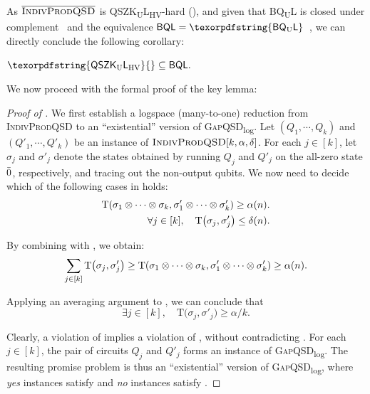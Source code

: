 \documentclass[11pt, a4paper]{article}
\numberwithin{equation}{section}
\numberwithin{figure}{section}
\newcommand{\QSZKULHV}{\texorpdfstring{\textnormal{\textsf{QSZK}\textsubscript{\textnormal{U}}\textsf{L}}\textsubscript{\textnormal{HV}}}\xspace}
\newcommand{\BQL}{\textnormal{\textsf{BQL}}\xspace}
\newcommand{\BQUL}{\texorpdfstring{\textnormal{\textsf{BQ}\textsubscript{U}\textsf{L}}}\xspace}
\newcommand{\textoverline}[1]{$\overline{\mbox{#1}}$}
\newcommand{\GapQSDlog}{\texorpdfstring{\textnormal{\textsc{GapQSD}\textsubscript{log}}}\xspace}
\newcommand{\IndivProdQSD}{\textnormal{\textsc{IndivProdQSD}}\xspace}
\newcommand{\coIndivProdQSD}{\texorpdfstring{\textnormal{\textoverline{\textsc{IndivProdQSD}}}}\xspace}
\DeclarePairedDelimiter\rbra{\lparen}{\rparen}
\let\ket\relax\DeclarePairedDelimiter\ket{\lvert}{\rangle}
\newcommand{\td}{\mathrm{T}}
\begin{document}
As \coIndivProdQSD{} is \QSZKULHV{}-hard (), and given that \BQUL{} is closed under complement~\cite[Corollary 4.8]{Wat99} and the equivalence $\BQL=\BQUL$~\cite{FR21}, we can directly conclude the following corollary:

\begin{corollary}
    $\QSZKULHV{} \subseteq \BQL{}.$
\end{corollary}

We now proceed with the formal proof of the key lemma: 

\begin{proof}[Proof of ]
    We first establish a logspace (many-to-one) reduction from \IndivProdQSD{} to an ``existential'' version of \GapQSDlog{}. 
    Let $(Q_1,\cdots,Q_k)$ and $(Q'_1,\cdots,Q'_k)$ be an instance of $\IndivProdQSD[k,\alpha,\delta]$. For each $j\in[k]$, let $\sigma_j$ and $\sigma'_j$ denote the states obtained by running $Q_j$ and $Q'_j$ on the all-zero state $\ket{\bar{0}}$, respectively, and tracing out the non-output qubits. We now need to decide which of the following cases in  holds: 
    \begin{align}
        \td\rbra*{\sigma_1\otimes \cdots \otimes \sigma_k, \sigma'_1\otimes \cdots \otimes \sigma'_k} \geq \alpha(n). \label{eq:IndivProdQSD-far}\\
        \forall j \in [k], \quad \td\big(\sigma_j, \sigma'_j\big) \leq \delta(n) \label{eq:IndivProdQSD-close}.
    \end{align}

    By combining  with , we obtain: 
    \begin{equation}
        \label{eq:IndivProdQSD-farE}
        \sum_{j\in[k]} \td\big(\sigma_j, \sigma'_j\big) \geq 
        \td\rbra*{\sigma_1\otimes \cdots \otimes \sigma_k, \sigma'_1\otimes \cdots \otimes \sigma'_k} \geq \alpha(n).
    \end{equation}

    Applying an averaging argument to , we can conclude that
    \begin{equation}
        \label{eq:IndivProdQSD-far-invidual}
        \exists j\in[k], \quad \td\big(\sigma_j, \sigma'_j\big) \geq \alpha/k. 
    \end{equation}
    
    Clearly, a violation of  implies a violation of , without contradicting . 
    For each $j\in[k]$, the pair of circuits $Q_j$ and $Q'_j$ forms an instance of \GapQSDlog{}. The resulting promise problem is thus an ``existential'' version of \GapQSDlog{}, where \textit{yes} instances satisfy  and \textit{no} instances satisfy . 


\end{proof}
\end{document}
